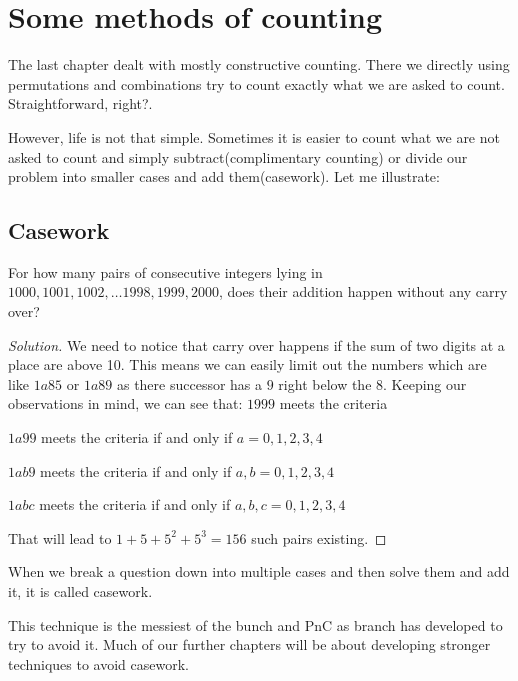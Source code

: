 \chapter{Some methods of counting}
The last chapter dealt with mostly constructive counting. 
There we directly using permutations and combinations try to count exactly 
what we are asked to count. Straightforward, right?.\par
However, life is not that simple. Sometimes it is easier to count what we are 
not asked to count and simply subtract(complimentary counting) or divide our problem
into smaller cases and add them(casework). Let me illustrate:
\section{Casework}
\begin{example}
    For how many pairs of consecutive integers lying in 
    {$1000, 1001, 1002, \dots 1998, 1999, 2000$}, does their addition happen without any carry over?
\end{example}
\begin{proof}
    [Solution]
We need to notice that carry over happens if the sum of two digits at a place are above 10. 
This means we can easily limit out the numbers which are like $1a85$ or $1a89$ as there successor 
has a $9$ right below the $8$.
    Keeping our observations in mind, we can see that: 
    $1999$ meets the criteria\par
    $1a99$ meets the criteria if and only if $a=0,1,2,3,4$\par
    $1ab9$ meets the criteria if and only if $a,b=0,1,2,3,4$\par
    $1abc$ meets the criteria if and only if $a,b,c=0,1,2,3,4$\par
    That will lead to $1+5+5^2+5^3=156$ such pairs existing.
\end{proof}
When we break a question down into multiple cases and then solve them and add it, it is called casework.\par
This technique is the messiest of the bunch and PnC as branch has developed to try to avoid it. Much of our 
further chapters will be about developing stronger techniques to avoid casework.

